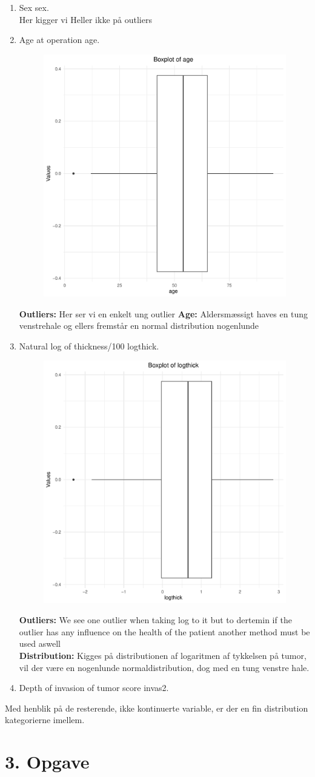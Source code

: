\begin{enumerate}
\item Sex sex.\\
Her kigger vi Heller ikke på outliers
\item Age at operation age.
\newline
\begin{figure}[h]
    \centering
    \includegraphics[width=0.6\linewidth]{Basses_kode/Billeder_duration/Boxplot_of_ age .pdf}
\end{figure}
\textbf{Outliers: }Her ser vi en enkelt ung outlier 
\textbf{Age: } Aldersmæssigt haves en tung venstrehale og ellers fremstår en normal distribution nogenlunde
\newpage
\item Natural log of thickness/100 logthick.
\newline
\begin{figure}[h]
    \centering
    \includegraphics[width=0.6\linewidth]{Basses_kode/Billeder_duration/Boxplot_of_ logthick .pdf}
\end{figure}
\textbf{Outliers: }We see one outlier when taking log to it but to dertemin if the outlier has any influence on the health of the patient another method must be used aswell\\
\textbf{Distribution: }Kigges på distributionen af logaritmen af tykkelsen på tumor, vil der være en nogenlunde normaldistribution, dog med en tung venstre hale.
\item Depth of invasion of tumor score invas2.
\end{enumerate}

Med henblik på de resterende, ikke kontinuerte variable, er der en fin distribution kategorierne imellem.



\chapter{3. Opgave}
